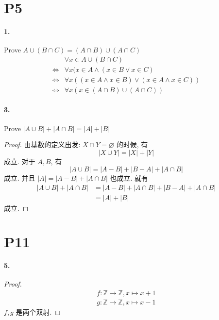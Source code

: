 \documentclass[12pt]{ctexart}
\theoremstyle{definition}
\theoremstyle{definition}
\theoremstyle{plain}
\theoremstyle{remark}
\begin{document}
\section*{P5}\label{sec:p5}
\paragraph{1.} Prove \(A \cup (B \cap C) = (A \cap B) \cup (A \cap C)\)
\begin{align}
	& \forall x \in A \cup( B\cap C) \\
	\iff & \forall x (x \in A \wedge (x \in B \vee x \in C) \\
	\iff & \forall x ( (x \in A \wedge x \in B ) \vee (x \in A \wedge x \in C) ) \\ 
	\iff & \forall x (x \in (A \cap B ) \cup (A \cap C) ) 
\end{align}

\paragraph{3.} Prove \(| A \cup B | + | A \cap B| = |A| + |B|\)
\begin{proof}
由基数的定义出发: \(X \cap Y = \varnothing\) 的时候, 有 
\begin{equation}
|X \cup Y | = |X | + |Y | 
\end{equation}
成立. 
对于 \(A , B\), 有 
\begin{equation}
	|A \cup B | = | A - B | + | B  -A | + | A \cap B |
\end{equation}
成立. 并且 \( |A| = |A - B | + |A \cap B|\) 也成立. 就有 
\begin{align}
	|A \cup B  | + |A \cap B | & =  |A - B | + |A \cap B | + | B  - A| + | A \cap B | \\
	& = |A| + |B| 
\end{align}
成立.
\end{proof}

\section*{P11}\label{sec:p11}
\paragraph{5. } 
\begin{proof}
\begin{align}
	f \colon \mathbb{Z} \to \mathbb{Z} , x \mapsto x + 1 \\
	g \colon \mathbb{Z} \to \mathbb{Z}, x \mapsto x -1
\end{align}
\(f,g\) 是两个双射.
\end{proof}
\end{document}
